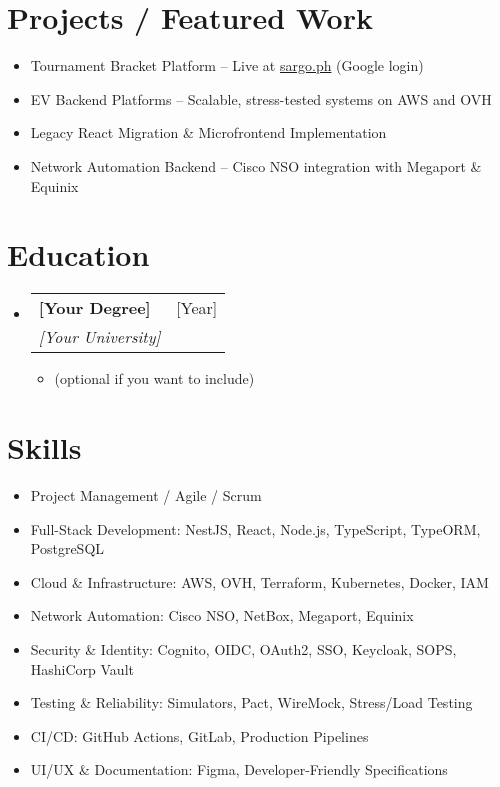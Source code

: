 \documentclass[letterpaper,11pt]{article}
\makeatletter
\newcommand{\resumeItem}[1]{
  \item\small{#1 \vspace{-2pt}}
}
\newcommand{\resumeSubheading}[4]{
  \vspace{-2pt}\item
    \begin{tabular*}{0.97\textwidth}[t]{l@{\extracolsep{\fill}}r}
      \textbf{#1} & #2 \\
      \textit{\small#3} & \textit{\small#4} \\
    \end{tabular*}\vspace{-7pt}
}
\newcommand{\resumeSubheadingListStart}{\begin{itemize}[leftmargin=0.15in, label={}]}
\newcommand{\resumeSubheadingListEnd}{\end{itemize}}
\newcommand{\resumeItemListStart}{\begin{itemize}[leftmargin=0.15in, noitemsep, label={$\cdot$}]}
\newcommand{\resumeItemListEnd}{\end{itemize}\vspace{-5pt}}
\makeatother
\begin{document}
\section{Projects / Featured Work}
  \resumeItemListStart
    \resumeItem{Tournament Bracket Platform – Live at \href{https://sargo.ph}{sargo.ph} (Google login)}
    \resumeItem{EV Backend Platforms – Scalable, stress-tested systems on AWS and OVH}
    \resumeItem{Legacy React Migration \& Microfrontend Implementation}
    \resumeItem{Network Automation Backend – Cisco NSO integration with Megaport \& Equinix}
  \resumeItemListEnd

\section{Education}
  \resumeSubheadingListStart
    \resumeSubheading{[Your Degree]}{[Year]}
      {[Your University]}{}
      \resumeItemListStart
        \resumeItem{(optional if you want to include)}
      \resumeItemListEnd
  \resumeSubheadingListEnd

\section{Skills}
  \resumeItemListStart
    \resumeItem{Project Management / Agile / Scrum}
    \resumeItem{Full-Stack Development: NestJS, React, Node.js, TypeScript, TypeORM, PostgreSQL}
    \resumeItem{Cloud \& Infrastructure: AWS, OVH, Terraform, Kubernetes, Docker, IAM}
    \resumeItem{Network Automation: Cisco NSO, NetBox, Megaport, Equinix}
    \resumeItem{Security \& Identity: Cognito, OIDC, OAuth2, SSO, Keycloak, SOPS, HashiCorp Vault}
    \resumeItem{Testing \& Reliability: Simulators, Pact, WireMock, Stress/Load Testing}
    \resumeItem{CI/CD: GitHub Actions, GitLab, Production Pipelines}
    \resumeItem{UI/UX \& Documentation: Figma, Developer-Friendly Specifications}
  \resumeItemListEnd
\end{document}
